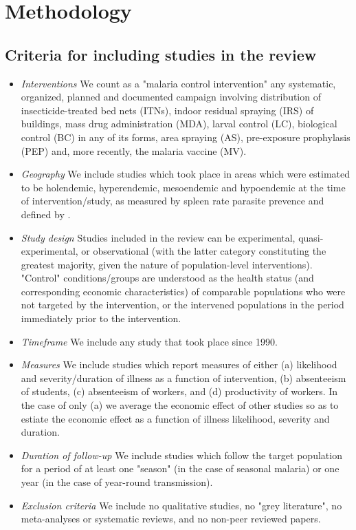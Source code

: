 \documentclass{article}
\begin{document}
\section*{Methodology}

\subsection*{Criteria for including studies in the review}

\vspace{-2mm}


\begin{itemize}
  \setlength\itemsep{-1em}

\item \emph{Interventions} We count as a "malaria control intervention" any systematic, organized, planned and documented campaign involving distribution of insecticide-treated bed nets (ITNs), indoor residual spraying (IRS) of buildings, mass drug administration (MDA), larval control (LC), biological control (BC) in any of its forms, area spraying (AS), pre-exposure prophylasis (PEP) and, more recently, the malaria vaccine (MV). \\
\item \emph{Geography} We include studies which took place in areas which were estimated to be holendemic, hyperendemic, mesoendemic and hypoendemic at the time of intervention/study, as measured by spleen rate parasite prevence and defined by \cite{Hay2008}. \\
\item \emph{Study design} Studies included in the review can be experimental, quasi-experimental, or observational (with the latter category constituting the greatest majority, given the nature of population-level interventions). "Control" conditions/groups are understood as the health status (and corresponding economic characteristics) of comparable populations who were not targeted by the intervention, or the intervened populations in the period immediately prior to the intervention. \\ 
\item \emph{Timeframe} We include any study that took place since 1990. \\
\item \emph{Measures} We include studies which report measures of either (a) likelihood and severity/duration of illness as a function of intervention, (b) absenteeism of students, (c) absenteeism of workers, and (d) productivity of workers. In the case of only (a) we average the economic effect of other studies so as to estiate the economic effect as a function of illness likelihood, severity and duration. \\
\item \emph{Duration of follow-up} We include studies which follow the target population for a period of at least one "season" (in the case of seasonal malaria) or one year (in the case of year-round transmission). \\
\item \emph{Exclusion criteria} We include no qualitative studies, no "grey literature", no meta-analyses or systematic reviews, and no non-peer reviewed papers.
\end{itemize}
\end{document}
